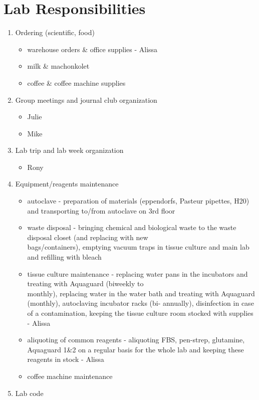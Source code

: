 \documentclass[]{book}
\providecommand{\tightlist}{%
  \setlength{\itemsep}{0pt}\setlength{\parskip}{0pt}}
\begin{document}
\chapter{Lab Responsibilities}\label{labResponsibilities}

\begin{enumerate}
\def\labelenumi{\arabic{enumi}.}
\item
  Ordering (scientific, food)

  \begin{itemize}
  \tightlist
  \item
    warehouse orders \& office supplies - Alissa
  \item
    milk \& machonkolet
  \item
    coffee \& coffee machine supplies
  \end{itemize}
\item
  Group meetings and journal club organization

  \begin{itemize}
  \tightlist
  \item
    Julie
  \item
    Mike
  \end{itemize}
\item
  Lab trip and lab week organization

  \begin{itemize}
  \tightlist
  \item
    Rony
  \end{itemize}
\item
  Equipment/reagents maintenance

  \begin{itemize}
  \tightlist
  \item
    autoclave - preparation of materials (eppendorfs, Pasteur pipettes,
    H20) and transporting to/from autoclave on 3rd floor
  \item
    waste disposal - bringing chemical and biological waste to the waste
    disposal closet (and replacing with new\\
    bags/containers), emptying vacuum traps in tissue culture and main
    lab and refilling with bleach
  \item
    tissue culture maintenance - replacing water pans in the incubators
    and treating with Aquaguard (biweekly to\\
    monthly), replacing water in the water bath and treating with
    Aquaguard (monthly), autoclaving incubator racks (bi- annually),
    disinfection in case of a contamination, keeping the tissue culture
    room stocked with supplies - Alissa
  \item
    aliquoting of common reagents - aliquoting FBS, pen-strep,
    glutamine, Aquaguard 1\&2 on a regular basis for the whole lab and
    keeping these reagents in stock - Alissa
  \item
    coffee machine maintenance
  \end{itemize}
\item
  Lab code


\end{enumerate}
\end{document}
